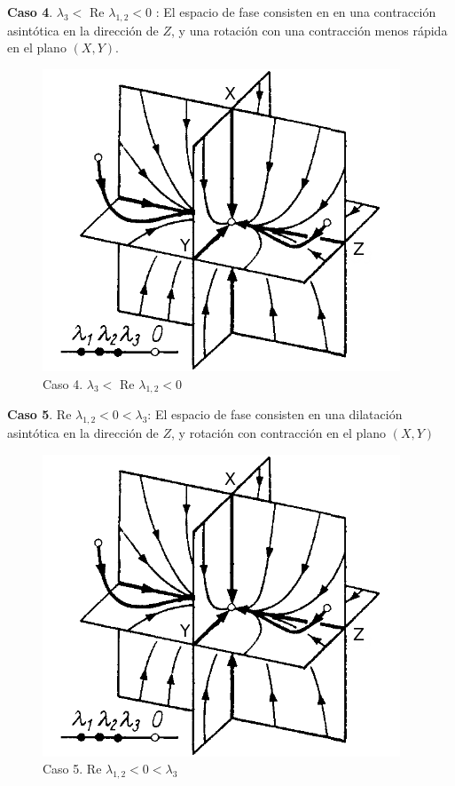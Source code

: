 \documentclass[a4paper,10pt]{article}
\begin{document}
\textbf{Caso 4}. $\lambda_3 <$ Re $\lambda_{1,2} < 0$ : El espacio de fase consisten en en una contracción asintótica
en la dirección de $Z$, y una rotación con una contracción menos rápida en el plano
$(X,Y)$.

\begin{figure}[h]
 \centering
\includegraphics[scale=0.3]{problema3fig2}
\caption{Caso 4. $\lambda_3 <$ Re $\lambda_{1,2} < 0$}
\label{fig:problema3fig5}
\end{figure}
\vspace{.3cm}

\textbf{Caso 5}. Re $\lambda_{1,2} < 0 < \lambda_3$: El espacio de fase consisten en una dilatación asintótica
en la dirección de $Z$, y rotación con contracción en el plano $(X,Y)$

\begin{figure}[h]
 \centering
\includegraphics[scale=0.3]{problema3fig2}
\caption{Caso 5. Re $\lambda_{1,2} < 0 < \lambda_3$}
\label{fig:problema3fig6}
\end{figure}
\vspace{.3cm}
\end{document}
